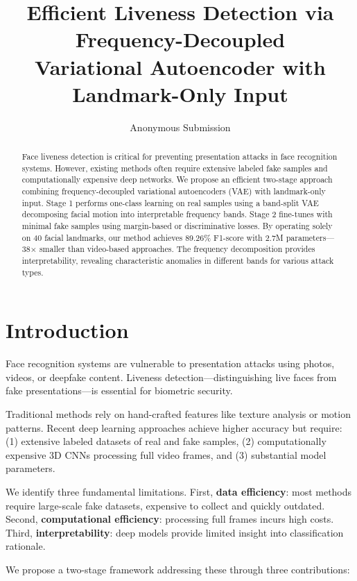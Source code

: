 \documentclass[10pt,twocolumn,letterpaper]{article}
\title{\Large \bf Efficient Liveness Detection via Frequency-Decoupled \\ Variational Autoencoder with Landmark-Only Input}
\author{
Anonymous Submission
}
\date{}
\begin{document}
\maketitle
\thispagestyle{empty}

\begin{abstract}
Face liveness detection is critical for preventing presentation attacks in face recognition systems. However, existing methods often require extensive labeled fake samples and computationally expensive deep networks. We propose an efficient two-stage approach combining frequency-decoupled variational autoencoders (VAE) with landmark-only input. Stage 1 performs one-class learning on real samples using a band-split VAE decomposing facial motion into interpretable frequency bands. Stage 2 fine-tunes with minimal fake samples using margin-based or discriminative losses. By operating solely on 40 facial landmarks, our method achieves 89.26\% F1-score with 2.7M parameters—38$\times$ smaller than video-based approaches. The frequency decomposition provides interpretability, revealing characteristic anomalies in different bands for various attack types.
\end{abstract}

\section{Introduction}

Face recognition systems are vulnerable to presentation attacks using photos, videos, or deepfake content. Liveness detection—distinguishing live faces from fake presentations—is essential for biometric security.

Traditional methods rely on hand-crafted features like texture analysis or motion patterns. Recent deep learning approaches achieve higher accuracy but require: (1) extensive labeled datasets of real and fake samples, (2) computationally expensive 3D CNNs processing full video frames, and (3) substantial model parameters.

We identify three fundamental limitations. First, \textbf{data efficiency}: most methods require large-scale fake datasets, expensive to collect and quickly outdated. Second, \textbf{computational efficiency}: processing full frames incurs high costs. Third, \textbf{interpretability}: deep models provide limited insight into classification rationale.

We propose a two-stage framework addressing these through three contributions:
\end{document}
